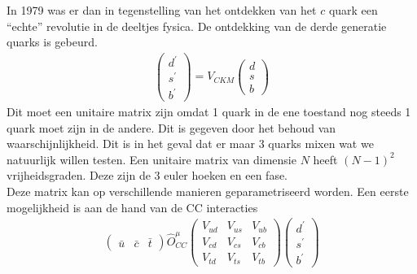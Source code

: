 \documentclass[../main.tex]{subfiles}
\begin{document}
In 1979 was er dan in tegenstelling van het ontdekken van het $c$ quark een ``echte'' revolutie in de deeltjes fysica. De ontdekking van de derde generatie quarks is gebeurd.
\begin{equation}
    \begin{aligned}
        \label{eq:ckm_mat}
        \left(\begin{array}{c}
                d^{\prime} \\
                s^{\prime} \\
                b^{\prime}
                \end{array}\right)=V_{C K M}\left(\begin{array}{l}
                d \\
                s \\
                b
        \end{array}\right)
    \end{aligned}
\end{equation}
Dit moet een unitaire matrix zijn omdat 1 quark in de ene toestand nog steeds 1 quark moet zijn in de andere. Dit is gegeven door het behoud van waarschijnlijkheid. Dit is in het geval dat er maar 3 quarks mixen wat we natuurlijk willen testen. Een unitaire matrix van dimensie $N$ heeft $(N-1)^2$ vrijheidsgraden. Deze zijn de 3 euler hoeken en een fase.\\
Deze matrix kan op verschillende manieren geparametriseerd worden. Een eerste mogelijkheid is aan de hand van de CC interacties
\begin{equation}
    \begin{aligned}
        \label{eq:cc_int_ckm}
        \left(\begin{array}{ccc}
                \bar{u} & \bar{c} & \bar{t}
                \end{array}\right) \hat{O}_{C C}^{\mu}\left(\begin{array}{ccc}
                V_{u d} & V_{u s} & V_{u b} \\
                V_{c d} & V_{c s} & V_{c b} \\
                V_{t d} & V_{t s} & V_{t b}
                \end{array}\right)\left(\begin{array}{l}
                d^{\prime} \\
                s^{\prime} \\
                b^{\prime}
        \end{array}\right)
    \end{aligned}
\end{equation}
\end{document}

